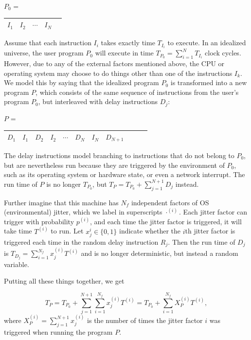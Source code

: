 \documentclass[conference]{IEEEtran}
\begin{document}
$P_0$ = \begin{tabular}{|c|c|c|c|c|}
\hline
$I_1$ & $I_2$ & $\cdots$ & $I_N$ \tabularnewline
\hline
\end{tabular}

Assume that each instruction $I_i$ takes exactly time $T_{I_i}$ to execute.
In an idealized universe, the user program $P_0$ will execute in time $T_{P_0} = \sum_{i=1}^N T_{I_i}$ clock cycles. However, due to any of the external factors mentioned above, the CPU or operating system may choose to do things other than one of the instructions $I_k$. We model this by saying that the idealized program $P_0$ is transformed into a new program $P$, which consists of the same sequence of instructions from the user's program $P_0$, but interleaved with delay instructions $D_j$:

$P$ = \begin{tabular}{|c|c|c|c|c|c|c|c|c|c|c|}
\hline
$D_1$ & $I_1$ & $D_2$ & $I_2$ &
$\cdots$ & $D_N$ & $I_N$ & $D_{N+1}$
\tabularnewline
\hline
\end{tabular}

The delay instructions model branching to instructions that do not belong to $P_0$, but are nevertheless run because they are triggered by the environment of $P_0$, such as its operating system or hardware state, or even a network interrupt. The run time of $P$ is no longer $T_{P_0}$, but
$T_P = T_{P_0} + \sum_{j=1}^{N+1} D_j$ instead.

Further imagine that this machine has $N_f$ independent factors of OS (environmental) jitter, which we label in superscripts $\cdot^{(i)}$. Each jitter factor can trigger with probability $p^{(i)}$, and each time the jitter factor is triggered, it will take time $T^{(i)}$ to run. Let $x^{i}_j \in \{0, 1\}$ indicate whether the $i$th jitter factor is triggered each time in the random delay instruction $R_j$. Then the run time of $D_j$ is
$T_{D_j} = \sum_{i=1}^{N_f} x^{(i)}_j T^{(i)}$ and is no longer deterministic, but instead a random variable.

Putting all these things together, we get

\begin{equation}
T_P = T_{P_0} + \sum_{j=1}^{N+1} \sum_{i=1}^{N_f} x^{(i)}_j T^{(i)}
= T_{P_0} + \sum_{i=1}^{N_f} X_P^{(i)} T^{(i)},
\end{equation}
%
where $X_P^{(i)} = \sum_{j=1}^{N+1} x^{(i)}_j$ is the number of times the jitter factor $i$ was triggered when running the program $P$.
\end{document}
